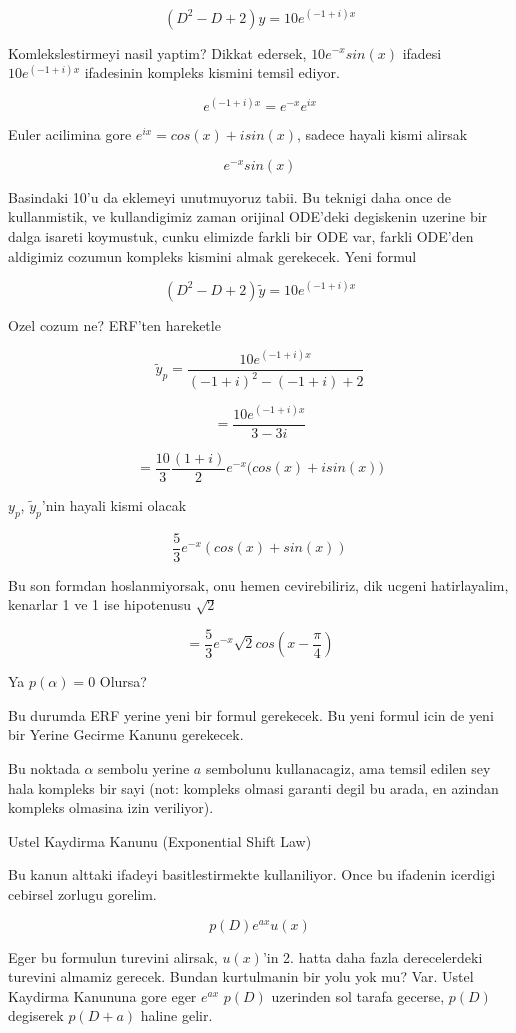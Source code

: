\documentclass[12pt,fleqn]{article}
\begin{document}
\[ (D^2 - D + 2)y = 10 e ^{(-1 + i)x} \]

Komlekslestirmeyi nasil yaptim? Dikkat edersek, $10e^{-x}sin(x)$ ifadesi
$10 e^{(-1 + i)x}$ ifadesinin kompleks kismini temsil ediyor. 

\[ e ^{(-1 + i)x} = e^{-x} e^{ix} \]

Euler acilimina gore $e^{ix} = cos(x) + isin(x)$, sadece hayali kismi alirsak

\[ e^{-x} sin(x)  \]

Basindaki 10'u da eklemeyi unutmuyoruz tabii. Bu teknigi daha once de
kullanmistik, ve kullandigimiz zaman orijinal ODE'deki degiskenin uzerine
bir dalga isareti koymustuk, cunku elimizde farkli bir ODE var, farkli
ODE'den aldigimiz cozumun kompleks kismini almak gerekecek. Yeni formul

\[ (D^2 - D + 2)\tilde{y} = 10 e ^{(-1 + i)x} \]

Ozel cozum ne? ERF'ten hareketle

\[ \tilde{y}_p = \frac{10 e^{(-1+i)x}}{(-1+i)^2 - (-1+i) + 2} \]

\[  = \frac{10 e^{(-1+i)x}}{3 - 3i} \]

\[ = \frac{10}{3}\frac{(1+i)}{2} e^{-x} \bigg( cos(x) + isin(x) \bigg)\]

$y_p$, $\tilde{y}_p$'nin hayali kismi olacak

\[ \frac{5}{3}e^{-x}( cos(x) + sin(x)) \]

Bu son formdan hoslanmiyorsak, onu hemen cevirebiliriz, dik ucgeni
hatirlayalim, kenarlar 1 ve 1 ise hipotenusu $\sqrt{2}$

\[ = \frac{5}{3}e^{-x} \sqrt{2}cos(x - \frac{\pi}{4})\]

Ya $p(\alpha) = 0$ Olursa?

Bu durumda ERF yerine yeni bir formul gerekecek. Bu yeni formul icin de
yeni bir Yerine Gecirme Kanunu gerekecek. 

Bu noktada $\alpha$ sembolu yerine $a$ sembolunu kullanacagiz, ama temsil
edilen sey hala kompleks bir sayi (not: kompleks olmasi garanti degil bu
arada, en azindan kompleks olmasina izin veriliyor). 

Ustel Kaydirma Kanunu (Exponential Shift Law)

Bu kanun alttaki ifadeyi basitlestirmekte kullaniliyor. Once bu ifadenin
icerdigi cebirsel zorlugu gorelim.

\[ p(D)e^{ax}u(x) \]

Eger bu formulun turevini alirsak, $u(x)$'in 2. hatta daha fazla
derecelerdeki turevini almamiz gerecek. Bundan kurtulmanin bir yolu yok mu?
Var. Ustel Kaydirma Kanununa gore eger $e^{ax}$ $p(D)$ uzerinden sol tarafa
gecerse, $p(D)$ degiserek $p(D+a)$ haline gelir. 
\end{document}
